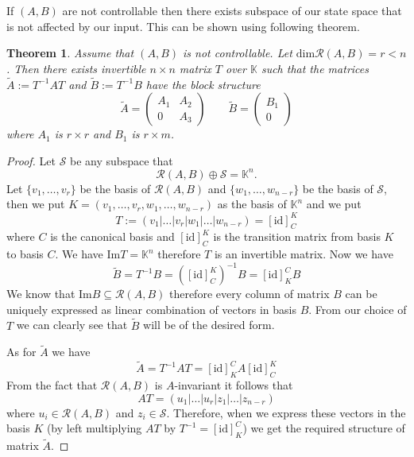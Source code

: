 \documentclass[12pt,a4paper]{report}
\newcommand{\K}{\mathbb{K}}
\newtheorem{theorem}{Theorem}[]
\begin{document}
If $(A,B)$ are not controllable then there exists subspace of our state space that is not affected by our input. This can be shown using following theorem.

\begin{theorem}
	\label{theorem:decomp}
	Assume that $(A,B)$ is not controllable. Let $\text{dim}\mathcal{R}(A,B)=r<n$. Then there exists invertible $n\times n$ matrix $T$ over $\K$ such that the matrices $\widetilde{A}:=T^{-1}AT$ and $\widetilde{B}:=T^{-1}B$ have the block structure 
	\begin{equation*}
		\widetilde{A}=
		\begin{pmatrix}
			A_1 & A_2 \\
			0   & A_3 
		\end{pmatrix}
		\qquad
		\widetilde{B}=
		\begin{pmatrix}
			B_1  \\
			0
		\end{pmatrix}
	\end{equation*}
	where $A_1$ is $r \times r$ and $B_1$ is $r \times m$.
\end{theorem}

\begin{proof}
	Let $\mathcal{S}$ be any subspace that $$\mathcal{R}(A,B)\oplus\mathcal{S}=\K^n.$$ Let $\{v_1,\ldots,v_r\}$ be the basis of $\mathcal{R}(A,B)$ and $\{w_1,\ldots,w_{n-r}\}$ be the basis of $\mathcal{S}$, then we put $K=(v_1,\ldots,v_r,w_1,\ldots,w_{n-r})$ as the basis of $\K^n$ and we put $$T:=(v_1|\ldots|v_r|w_1|\ldots|w_{n-r})=[\text{id}]^K_C$$ where $C$ is the canonical basis and $[\text{id}]^K_C$ is the transition matrix from basis $K$ to basis $C$. We have $\text{Im}T=\K^n$ therefore $T$ is an invertible matrix. Now we have $$\widetilde{B}=T^{-1}B=([\text{id}]^K_C)^{-1}B=[\text{id}]^C_KB$$ We know that $\text{Im}B\subseteq\mathcal{R}(A,B)$ therefore every column of matrix $B$ can be uniquely expressed as linear combination of vectors in basis $B$. From our choice of $T$ we can clearly see that $\widetilde{B}$ will be of the desired form.
	
	As for $\widetilde{A}$ we have $$\widetilde{A}=T^{-1}AT=[\text{id}]^C_KA[\text{id}]^K_C$$ From the fact that $\mathcal{R}(A,B)$ is $A$-invariant it follows that $$AT=(u_1|\ldots|u_r|z_1|\ldots|z_{n-r})$$ where $u_i \in \mathcal{R}(A,B)$ and $z_i \in \mathcal{S}$. Therefore, when we express these vectors in the basis $K$ (by left multiplying $AT$ by $T^{-1}=[\text{id}]^C_K$) we get the required structure of matrix $\widetilde{A}$.
\end{proof}
\end{document}

